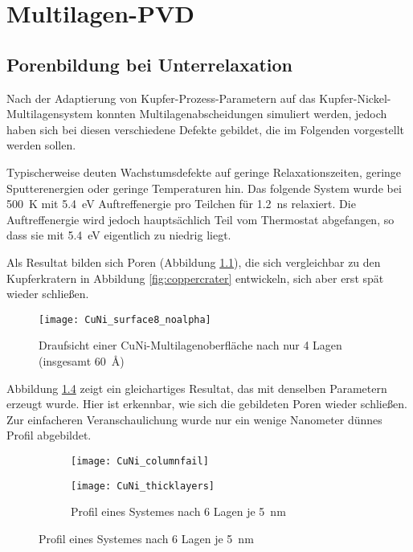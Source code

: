 \chapter{Multilagen-PVD}
\label{appendix:multilayer}

\section{Porenbildung bei Unterrelaxation}

Nach der Adaptierung von Kupfer-Prozess-Parametern auf das Kupfer-Nickel-Multilagensystem konnten Multilagenabscheidungen simuliert werden, jedoch haben sich bei diesen verschiedene Defekte gebildet, die im Folgenden vorgestellt werden sollen.

Typischerweise deuten Wachstumsdefekte auf geringe Relaxationszeiten, geringe Sputterenergien oder geringe Temperaturen hin.
Das folgende System wurde bei \SI{500}{\kelvin} mit \SI{5.4}{\electronvolt} Auftreffenergie pro Teilchen für \SI{1.2}{\nano\second} relaxiert.
Die Auftreffenergie wird jedoch hauptsächlich Teil vom Thermostat abgefangen, so dass sie mit \SI{5.4}{\electronvolt} eigentlich zu niedrig liegt.

Als Resultat bilden sich Poren (Abbildung \ref{fig:multilayer_surfacefail}), die sich vergleichbar zu den Kupferkratern in Abbildung \ref{fig:coppercrater} entwickeln, sich aber erst spät wieder schließen.

\begin{figure}[h]
  \centering
  \texttt{[image: CuNi\_surface8\_noalpha]}
  \caption{Draufsicht einer CuNi-Multi\-lagen\-ober\-fläche nach nur 4 Lagen (insgesamt \SI{60}{\angstrom})}
  \label{fig:multilayer_surfacefail}
\end{figure}

\clearpage
Abbildung \ref{fig:multilayer_columnfail} zeigt ein gleichartiges Resultat, das mit denselben Parametern erzeugt wurde.
Hier ist erkennbar, wie sich die gebildeten Poren wieder schließen.
Zur einfacheren Veranschaulichung wurde nur ein wenige Nanometer dünnes Profil abgebildet.

\begin{figure}[h]
  \captionsetup[subfigure]{singlelinecheck=false}
  \def\subfigwidth{7cm}
  \begin{subfigure}[t]{\subfigwidth}
    \texttt{[image: CuNi\_columnfail]}
    \label{fig:multilayer_columnfail}
  \end{subfigure}
  \hfill
  \begin{subfigure}[t]{\subfigwidth}
    \texttt{[image: CuNi\_thicklayers]}
    \caption{Profil eines Systemes nach 6 Lagen je \SI{5}{\nano\meter}}
    \label{fig:multilayer_columnfail}
  \end{subfigure}
  \hfill
\end{figure}

